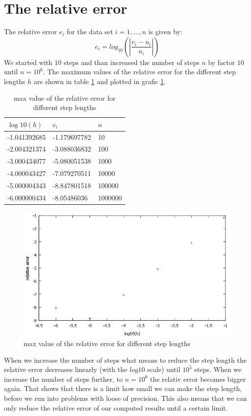 \documentclass{article}
\begin{document}
\section{The relative error}

The relative error $e_{i}$ for the data set $ i= 1,...,n$ is given by:
\begin{equation}
e_{i} = log_{10}\left(|\frac{v_{i}-u_{i}}{u_{i}}|\right)
\end{equation}
We started with $10$ steps and than increased the number of steps $n$ by factor $10$ until $n=10^6$. The maximum values of the relative error for the different step lengths $h$ are shown in table \ref{tab: rel. error} and plotted in grafic \ref{graf: rel. error}.
\begin{table}[H]
\centering
\caption{max value of the relative error for different step lengths}
\label{tab: rel. error}
\begin{tabular}{|l|l|l|}
	$\log10(h)$ & $e_i$ & $n$ \\
	\hline
	-1.041392685 & -1.179697782 & 10 \\
  -2.004321374 & -3.088036832 & 100 \\
  -3.000434077 & -5.080051538 & 1000 \\
  -4.000043427 & -7.079270511 & 10000 \\
  -5.000004343 & -8.847801518 & 100000 \\
  -6.000000434 & -8.05486036  & 1000000 \\	
\end{tabular}
\end{table}

\begin{figure}[H]
\centering
\caption{max value of the relative error for different step lengths}
\label{graf: rel. error}
\includegraphics [width = \textwidth] {plot_rel_error.jpg}
\end{figure}

When we increase the number of steps what means to reduce the step length the relative error decreases linearly (with the $log10$ scale) until $10^5$ steps. When we increase the number of steps further, to $n=10^6$ the relativ error becomes bigger again. That shows that there is a limit how small we can make the step length, before we run into problems with loose of precision. This also means that we can only reduce the relative error of our computed results until a certain limit.        
\end{document}
